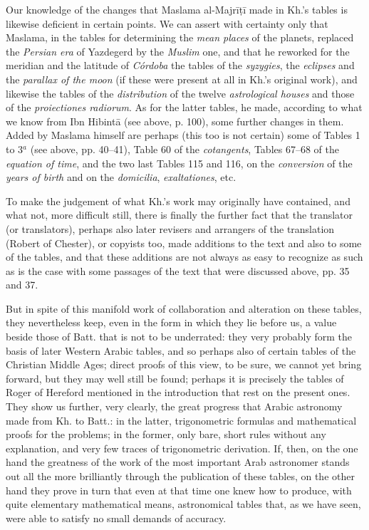 \documentclass[11pt]{article}
\begin{document}
\par Our knowledge of the changes that Maslama al-Majrīṭī made in Kh.'s tables is likewise deficient in certain points. We can assert with certainty only that Maslama, in the tables for determining the \emph{mean places} of the planets, replaced the \emph{Persian era} of Yazdegerd by the \emph{Muslim} one, and that he reworked for the meridian and the latitude of \emph{Córdoba} the tables of the \emph{syzygies}, the \emph{eclipses} and the \emph{parallax of the moon} (if these were present at all in Kh.'s original work), and likewise the tables of the \emph{distribution} of the twelve \emph{astrological houses} and those of the \emph{proiectiones radiorum}. As for the latter tables, he made, according to what we know from Ibn Hibintā (see above, p. 100), some further changes in them. Added by Maslama himself are perhaps (this too is not certain) some of Tables 1 to 3$^{a}$ (see above, pp. 40–41), Table 60 of the \emph{cotangents}, Tables 67–68 of the \emph{equation of time}, and the two last Tables 115 and 116, on the \emph{conversion} of the \emph{years of birth} and on the \emph{domicilia}, \emph{exaltationes}, etc.\par
\par To make the judgement of what Kh.'s work may originally have contained, and what not, more difficult still, there is finally the further fact that the translator (or translators), perhaps also later revisers and arrangers of the translation (Robert of Chester), or copyists too, made additions to the text and also to some of the tables, and that these additions are not always as easy to recognize as such as is the case with some passages of the text that were discussed above, pp. 35 and 37.\par
\par But in spite of this manifold work of collaboration and alteration on these tables, they nevertheless keep, even in the form in which they lie before us, a value beside those of Batt. that is not to be underrated: they very probably form the basis of later Western Arabic tables, and so perhaps also of certain tables of the Christian Middle Ages; direct proofs of this view, to be sure, we cannot yet bring forward, but they may well still be found; perhaps it is precisely the tables of Roger of Hereford mentioned in the introduction that rest on the present ones. They show us further, very clearly, the great progress that Arabic astronomy made from Kh. to Batt.: in the latter, trigonometric formulas and mathematical proofs for the problems; in the former, only bare, short rules without any explanation, and very few traces of trigonometric derivation. If, then, on the one hand the greatness of the work of the most important Arab astronomer stands out all the more brilliantly through the publication of these tables, on the other hand they prove in turn that even at that time one knew how to produce, with quite elementary mathematical means, astronomical tables that, as we have seen, were able to satisfy no small demands of accuracy.\par
\end{document}
